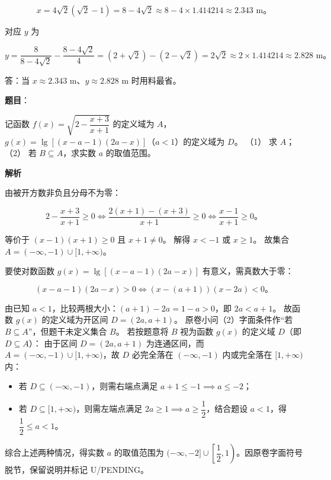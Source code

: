 \begin{answer}
\nopagebreak[4]
\[
x = 4\sqrt{2}(\sqrt{2} - 1) = 8 - 4\sqrt{2} \approx 8 - 4 \times 1.414214 \approx 2.343\text{ m}\mbox{。}
\]

对应 $y$ 为

\nopagebreak[4]
\[
y = \dfrac{8}{8 - 4\sqrt{2}} - \dfrac{8 - 4\sqrt{2}}{4} = (2 + \sqrt{2}) - (2 - \sqrt{2}) = 2\sqrt{2} \approx 2 \times 1.414214 \approx 2.828\text{ m}\mbox{。}
\]

答：当 $x \approx 2.343\text{ m}$、$y \approx 2.828\text{ m}$ 时用料最省。


\end{answer}
\begin{answer}

\textbf{题目}：

记函数 $f(x) = \sqrt{2 - \dfrac{x + 3}{x + 1}}$ 的定义域为 $A$，$g(x) = \lg[(x - a - 1)(2a - x)]$（$a < 1$）的定义域为 $D$。
（1） 求 $A$；
（2） 若 $B \subseteq A$，求实数 $a$ 的取值范围。

\textbf{解析}


由被开方数非负且分母不为零：

\nopagebreak[4]
\[
2 - \dfrac{x + 3}{x + 1} \geqslant 0 \iff \dfrac{2(x + 1) - (x + 3)}{x + 1} \geqslant 0 \iff \dfrac{x - 1}{x + 1} \geqslant 0\mbox{。}
\]

等价于 $(x - 1)(x + 1) \geqslant 0$ 且 $x + 1 \ne 0$。
解得 $x < -1$ 或 $x \geqslant 1$。
故集合 $A = (-\infty, -1) \cup [1, +\infty)$。


要使对数函数 $g(x) = \lg[(x - a - 1)(2a - x)]$ 有意义，需真数大于零：

\nopagebreak[4]
\[
(x - a - 1)(2a - x) > 0 \iff (x - (a + 1))(x - 2a) < 0\mbox{。}
\]

由已知 $a < 1$，比较两根大小：$(a + 1) - 2a = 1 - a > 0$，即 $2a < a + 1$。
故函数 $g(x)$ 的定义域为开区间 $D = (2a, a + 1)$。
原卷小问（2）字面条件作“若 $B \subseteq A$”，但题干未定义集合 $B$。
若按题意将 $B$ 视为函数 $g(x)$ 的定义域 $D$（即 $D \subseteq A$）：
由于区间 $D = (2a, a + 1)$ 为连通区间，而 $A = (-\infty, -1) \cup [1, +\infty)$，故 $D$ 必完全落在 $(-\infty, -1)$ 内或完全落在 $[1, +\infty)$ 内：
\begin{itemize}
\item 若 $D \subseteq (-\infty, -1)$，则需右端点满足 $a + 1 \leqslant -1 \implies a \leqslant -2$；
\item 若 $D \subseteq [1, +\infty)$，则需左端点满足 $2a \geqslant 1 \implies a \geqslant \dfrac{1}{2}$，结合题设 $a < 1$，得 $\dfrac{1}{2} \leqslant a < 1$。
\end{itemize}
综合上述两种情况，得实数 $a$ 的取值范围为 $(-\infty, -2] \cup \left[\dfrac{1}{2}, 1\right)$。因原卷字面符号脱节，保留说明并标记 U/PENDING。


\end{answer}
